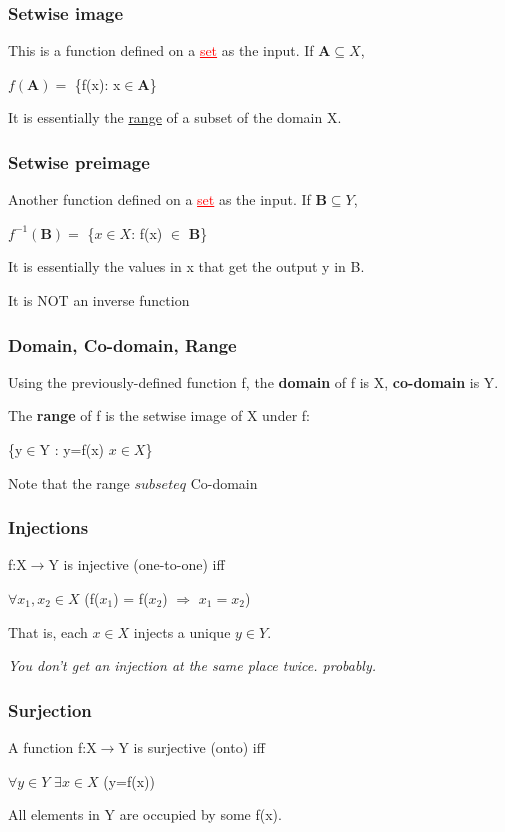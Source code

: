 \documentclass{article}
\newcommand{\sbreak}{\vspace{10pt}}
\begin{document}
\subsubsection{Setwise image}
This is a function defined on a \textcolor{red}{\underline{set}} as the input. If $\textbf{A}\subseteq X$,
\begin{center}
    $f(\textbf{A})=$ \{f(x): x$\in$\textbf{A}\}
\end{center}
It is essentially the \underline{range} of a subset of the domain X.

\subsubsection{Setwise preimage}
Another function defined on a  \textcolor{red}{\underline{set}} as the input. If $\textbf{B} \subseteq Y$,
\begin{center}
    $f^{-1}(\textbf{B}) = $ \{$x\in X$: f(x) $\in$ \textbf{B}\}
\end{center}
It is essentially the values in x that get the output y in B.

It is NOT an inverse function

\subsubsection{Domain, Co-domain, Range}
Using the previously-defined function f, the \textbf{domain} of f is X, \textbf{co-domain} is Y.

\sbreak

The \textbf{range} of f is the setwise image of X under f:
\begin{center}
    \{y$\in$Y : y=f(x) $x\in X$\}
\end{center}

Note that the range $subseteq$ Co-domain

\subsubsection{Injections}
f:X$\rightarrow$Y is injective (one-to-one) iff
\begin{center}
    $\forall x_1,x_2 \in X$ (f($x_1$) = f($x_2$) $\Rightarrow$ $x_1=x_2$)
\end{center}
That is, each $x\in X$ injects a unique $y\in Y$.

\textit{You don't get an injection at the same place twice. probably.}

\subsubsection{Surjection}
A function f:X$\rightarrow$Y is surjective (onto) iff
\begin{center}
    $\forall y \in Y$ $\exists x \in X$ (y=f(x))
\end{center}
All elements in Y are occupied by some f(x).
\end{document}
